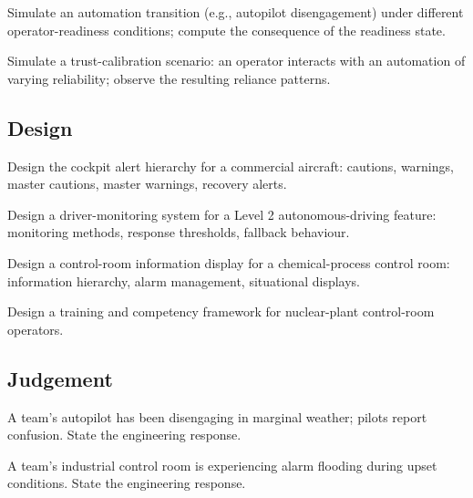 \begin{exercise}
Simulate an automation transition (e.g., autopilot disengagement) under different operator-readiness conditions; compute the consequence of the readiness state.
\end{exercise}

\begin{exercise}
Simulate a trust-calibration scenario: an operator interacts with an automation of varying reliability; observe the resulting reliance patterns.
\end{exercise}

\subsection*{Design}

\begin{exercise}
Design the cockpit alert hierarchy for a commercial aircraft: cautions, warnings, master cautions, master warnings, recovery alerts.
\end{exercise}

\begin{exercise}
Design a driver-monitoring system for a Level 2 autonomous-driving feature: monitoring methods, response thresholds, fallback behaviour.
\end{exercise}

\begin{exercise}
Design a control-room information display for a chemical-process control room: information hierarchy, alarm management, situational displays.
\end{exercise}

\begin{exercise}
Design a training and competency framework for nuclear-plant control-room operators.
\end{exercise}

\subsection*{Judgement}

\begin{exercise}
A team's autopilot has been disengaging in marginal weather; pilots report confusion. State the engineering response.
\end{exercise}

\begin{exercise}
A team's industrial control room is experiencing alarm flooding during upset conditions. State the engineering response.
\end{exercise}

